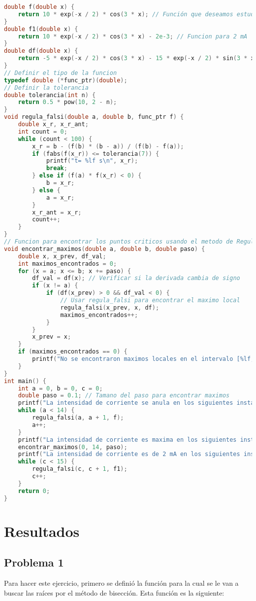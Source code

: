 \documentclass[12pt]{article}
\begin{document}
\begin{lstlisting}[language=C, caption={Problema 4.}, style=mystyle]
double f(double x) {
    return 10 * exp(-x / 2) * cos(3 * x); // Función que deseamos estudiar
}
double f1(double x) {
    return 10 * exp(-x / 2) * cos(3 * x) - 2e-3; // Funcion para 2 mA
}
double df(double x) {
    return -5 * exp(-x / 2) * cos(3 * x) - 15 * exp(-x / 2) * sin(3 * x); // Derivada de la funcion
}
// Definir el tipo de la funcion
typedef double (*func_ptr)(double);
// Definir la tolerancia
double tolerancia(int n) {
    return 0.5 * pow(10, 2 - n);
}
void regula_falsi(double a, double b, func_ptr f) {
    double x_r, x_r_ant;
    int count = 0;
    while (count < 100) {
        x_r = b - (f(b) * (b - a)) / (f(b) - f(a));
        if (fabs(f(x_r)) <= tolerancia(7)) {
            printf("t= %lf s\n", x_r);
            break;
        } else if (f(a) * f(x_r) < 0) {
            b = x_r;
        } else {
            a = x_r;
        }
        x_r_ant = x_r;
        count++;
    }
}
// Funcion para encontrar los puntos criticos usando el metodo de Regula Falsi
void encontrar_maximos(double a, double b, double paso) {
    double x, x_prev, df_val;
    int maximos_encontrados = 0;
    for (x = a; x <= b; x += paso) {
        df_val = df(x); // Verificar si la derivada cambia de signo
        if (x != a) {
            if (df(x_prev) > 0 && df_val < 0) {
                // Usar regula_falsi para encontrar el maximo local
                regula_falsi(x_prev, x, df);
                maximos_encontrados++;
            }
        }
        x_prev = x;
    }
    if (maximos_encontrados == 0) {
        printf("No se encontraron maximos locales en el intervalo [%lf, %lf].\n", a, b);
    }
}
int main() {
    int a = 0, b = 0, c = 0;
    double paso = 0.1; // Tamano del paso para encontrar maximos
    printf("La intensidad de corriente se anula en los siguientes instantes:\n");
    while (a < 14) {
        regula_falsi(a, a + 1, f);
        a++;
    }
    printf("La intensidad de corriente es maxima en los siguientes instantes:\n");
    encontrar_maximos(0, 14, paso);
    printf("La intensidad de corriente es de 2 mA en los siguientes instantes:\n");
    while (c < 15) {
        regula_falsi(c, c + 1, f1);
        c++;
    }
    return 0;
}
    \end{lstlisting}

\section{Resultados}
\subsection{Problema 1}
Para hacer este ejercicio, primero se definió la función para la cual se le van a buscar las raíces por el método de bisección. Esta función es la siguiente:
\end{document}
